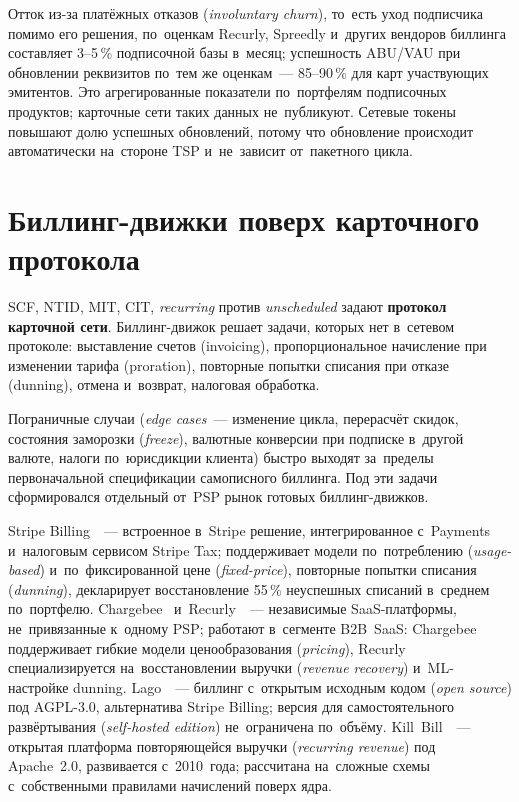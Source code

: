 Отток из-за платёжных отказов (\textit{involuntary churn}), то~есть уход
подписчика помимо его решения, по~оценкам Recurly, Spreedly и~других вендоров
биллинга составляет 3--5\,\% подписочной базы в~месяц; успешность ABU/VAU при обновлении реквизитов
по~тем же оценкам~--- 85--90\,\% для карт участвующих эмитентов. Это
агрегированные показатели по~портфелям подписочных продуктов; карточные сети
таких данных не~публикуют. Сетевые токены повышают долю успешных обновлений,
потому что обновление происходит автоматически на~стороне TSP и~не~зависит
от~пакетного цикла.

\section{Биллинг-движки поверх карточного протокола}\label{sec:subscription-billing-engines}

SCF, NTID, MIT, CIT, \textit{recurring} против \textit{unscheduled} задают \textbf{протокол
карточной сети}. Биллинг-движок решает задачи, которых нет в~сетевом протоколе:
выставление счетов (invoicing), пропорциональное начисление при изменении
тарифа (proration), повторные попытки списания при отказе (dunning), отмена
и~возврат, налоговая обработка.

Пограничные случаи (\textit{edge cases}~--- изменение цикла, перерасчёт
  скидок, состояния заморозки (\textit{freeze}), валютные конверсии при подписке
в~другой валюте, налоги по~юрисдикции клиента) быстро выходят за~пределы
первоначальной спецификации самописного биллинга. Под эти задачи сформировался отдельный
от~PSP рынок готовых биллинг-движков.

Stripe Billing~\cite{stripe-billing}~--- встроенное в~Stripe решение,
интегрированное с~Payments и~налоговым сервисом Stripe Tax; поддерживает
модели по~потреблению (\textit{usage-based}) и~по~фиксированной цене
(\textit{fixed-price}), повторные попытки списания (\textit{dunning}),
декларирует восстановление 55\,\% неуспешных списаний в~среднем по~портфелю.
Chargebee~\cite{chargebee-overview} и~Recurly~\cite{recurly-overview}~---
независимые SaaS-платформы, не~привязанные к~одному PSP; работают
в~сегменте B2B~SaaS: Chargebee поддерживает гибкие модели ценообразования
(\textit{pricing}), Recurly специализируется на~восстановлении выручки
(\textit{revenue recovery}) и~ML-настройке dunning. Lago~\cite{lago-overview}~--- биллинг
с~открытым исходным кодом (\textit{open source}) под AGPL-3.0, альтернатива
Stripe Billing; версия для самостоятельного развёртывания
(\textit{self-hosted edition}) не~ограничена по~объёму.
Kill~Bill~\cite{killbill-overview}~--- открытая платформа повторяющейся выручки
(\textit{recurring revenue}) под Apache~2.0, развивается с~2010~года;
рассчитана на~сложные схемы с~собственными правилами начислений поверх ядра.

